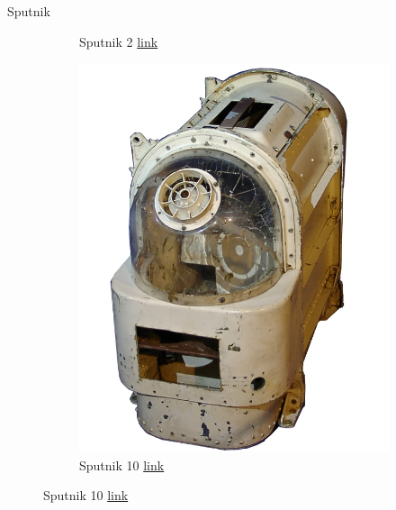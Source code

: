 \begin{frame}[fragile]{Sputnik}
\begin{figure}
\begin{subfigure}{0.33\textwidth}
			\caption{Sputnik 2 \href{http://www.alas-rojas.com/1-2.htm}{link}}
		\end{subfigure}
		\pause
		\begin{subfigure}{0.32\textwidth}
			\centering
			\includegraphics[scale=0.4]{./EtapaPrimeriza/imagenes/s10.jpg}
			\caption{Sputnik 10 \href{https://es.wikipedia.org/wiki/Sputnik\_10\#/media/File:Russian\_space\_dog\_box.jpg}{link}}
		\end{subfigure}
	\end{figure}
\end{frame}

